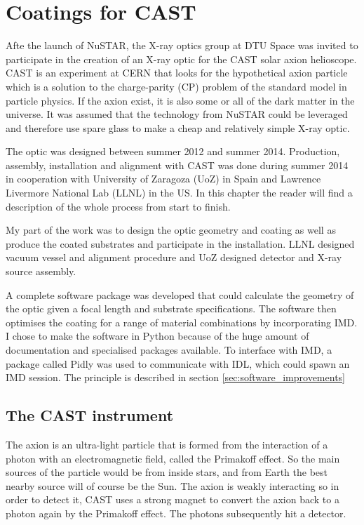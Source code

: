 \chapter{Coatings for CAST}
Afte the launch of NuSTAR, the X-ray optics group at DTU Space was invited to participate in the creation of an X-ray optic for the CAST solar axion helioscope. CAST is an experiment at CERN that looks for the hypothetical axion particle which is a solution to the charge-parity (CP) problem of the standard model in particle physics. If the axion exist, it is also some or all of the dark matter in the universe. It was assumed that the technology from NuSTAR could be leveraged and therefore use spare glass to make a cheap and relatively simple X-ray optic.

The optic was designed between summer 2012 and summer 2014. Production, assembly, installation and alignment with CAST was done during summer 2014 in cooperation with University of Zaragoza (UoZ) in Spain and Lawrence Livermore National Lab (LLNL) in the US. In this chapter the reader will find a description of the whole process from start to finish.

My part of the work was to design the optic geometry and coating as well as produce the coated substrates and participate in the installation. LLNL designed vacuum vessel and alignment procedure and UoZ designed detector and X-ray source assembly.

A complete software package was developed that could calculate the geometry of the optic given a focal length and substrate specifications. The software then optimises the coating for a range of material combinations by incorporating IMD. I chose to make the software in Python because of the huge amount of documentation and specialised packages available. To interface with IMD, a package called Pidly was used to communicate with IDL, which could spawn an IMD session. The principle is described in section \ref{sec:software_improvements}

\section{The CAST instrument}
The axion is an ultra-light particle that is formed from the interaction of a photon with an electromagnetic field, called the Primakoff effect. So the main sources of the particle would be from inside stars, and from Earth the best nearby source will of course be the Sun. The axion is weakly interacting so in order to detect it, CAST uses a strong magnet to convert the axion back to a photon again by the Primakoff effect. The photons subsequently hit a detector.

